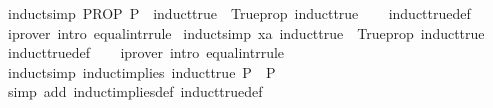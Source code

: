 \begin{isabellebody}
\ {\isacharbrackleft}{\kern0pt}induct{\isacharunderscore}{\kern0pt}simp{\isacharbrackright}{\kern0pt}{\isacharcolon}{\kern0pt}\ {\isachardoublequoteopen}{\isacharparenleft}{\kern0pt}PROP\ P\ {\isasymLongrightarrow}\ induct{\isacharunderscore}{\kern0pt}true{\isacharparenright}{\kern0pt}\ {\isasymequiv}\ Trueprop\ induct{\isacharunderscore}{\kern0pt}true{\isachardoublequoteclose}\isanewline
%
\isadelimproof
\ \ %
\endisadelimproof
%
\isatagproof
{}\isamarkupfalse%
\ induct{\isacharunderscore}{\kern0pt}true{\isacharunderscore}{\kern0pt}def\isanewline
\ \ \isamarkupfalse%
\ {\isacharparenleft}{\kern0pt}iprover\ intro{\isacharcolon}{\kern0pt}\ equal{\isacharunderscore}{\kern0pt}intr{\isacharunderscore}{\kern0pt}rule{\isacharparenright}{\kern0pt}%
\endisatagproof
{\isafoldproof}%
%
\isadelimproof
\isanewline
%
\endisadelimproof
\isanewline
{}\isamarkupfalse%
\ {\isacharbrackleft}{\kern0pt}induct{\isacharunderscore}{\kern0pt}simp{\isacharbrackright}{\kern0pt}{\isacharcolon}{\kern0pt}\ {\isachardoublequoteopen}{\isacharparenleft}{\kern0pt}{\isasymAnd}x{\isacharcolon}{\kern0pt}{\isacharcolon}{\kern0pt}{\isacharprime}{\kern0pt}a{\isacharcolon}{\kern0pt}{\isacharcolon}{\kern0pt}{\isacharbraceleft}{\kern0pt}{\isacharbraceright}{\kern0pt}{\isachardot}{\kern0pt}\ induct{\isacharunderscore}{\kern0pt}true{\isacharparenright}{\kern0pt}\ {\isasymequiv}\ Trueprop\ induct{\isacharunderscore}{\kern0pt}true{\isachardoublequoteclose}\isanewline
%
\isadelimproof
\ \ %
\endisadelimproof
%
\isatagproof
{}\isamarkupfalse%
\ induct{\isacharunderscore}{\kern0pt}true{\isacharunderscore}{\kern0pt}def\isanewline
\ \ \isamarkupfalse%
\ {\isacharparenleft}{\kern0pt}iprover\ intro{\isacharcolon}{\kern0pt}\ equal{\isacharunderscore}{\kern0pt}intr{\isacharunderscore}{\kern0pt}rule{\isacharparenright}{\kern0pt}%
\endisatagproof
{\isafoldproof}%
%
\isadelimproof
\isanewline
%
\endisadelimproof
\isanewline
{}\isamarkupfalse%
\ {\isacharbrackleft}{\kern0pt}induct{\isacharunderscore}{\kern0pt}simp{\isacharbrackright}{\kern0pt}{\isacharcolon}{\kern0pt}\ {\isachardoublequoteopen}induct{\isacharunderscore}{\kern0pt}implies\ induct{\isacharunderscore}{\kern0pt}true\ P\ {\isasymequiv}\ P{\isachardoublequoteclose}\isanewline
%
\isadelimproof
\ \ %
\endisadelimproof
%
\isatagproof
{}\isamarkupfalse%
\ {\isacharparenleft}{\kern0pt}simp\ add{\isacharcolon}{\kern0pt}\ induct{\isacharunderscore}{\kern0pt}implies{\isacharunderscore}{\kern0pt}def\ induct{\isacharunderscore}{\kern0pt}true{\isacharunderscore}{\kern0pt}def{\isacharparenright}{\kern0pt}%

\end{isabellebody}
